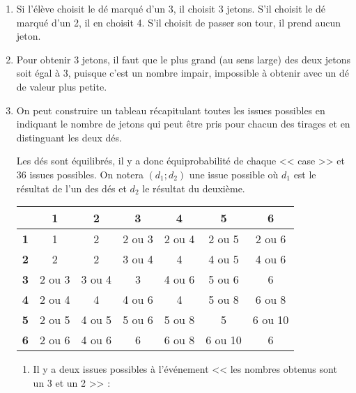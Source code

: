 \begin{enumerate}
    \item Si l'élève choisit le dé marqué d'un 3, il choisit 3 jetons. S'il choisit le dé marqué d'un 2, il en choisit 4. S'il choisit de passer son tour, il prend aucun jeton. \par
    \item Pour obtenir 3 jetons, il faut que  le plus grand (au sens large) des deux jetons soit égal à 3, puisque c'est un nombre impair, impossible à obtenir avec un dé de valeur plus petite. \par
    \item On peut construire un tableau récapitulant toutes les issues possibles en indiquant le nombre de jetons qui peut être pris pour chacun des tirages et en distinguant les deux dés. \par
       Les dés sont équilibrés, il y a donc équiprobabilité de chaque << case >> et 36 issues possibles. On notera $(d_1;d_2)$ une issue possible où $d_1$ est le résultat de l'un des dés et $d_2$ le résultat du deuxième.
       \begin{center}
          {
          \begin{tabular}{|*{7}{C{1.2}|}}
             \hline
             & \bf 1 & \bf 2 & \bf 3 & \bf 4 & \bf 5 & \bf 6 \\
             \hline
             \bf 1 & 1 & 2 & 2 ou 3 & 2 ou 4 & 2 ou 5 & 2 ou 6 \\
             \hline
             \bf 2 & 2 & 2 & 3 ou 4 & 4 & 4 ou 5 & 4 ou 6 \\
             \hline
             \bf 3 & 2 ou 3 & 3 ou 4 & 3 & 4 ou 6 & 5 ou 6 & 6 \\
             \hline
             \bf 4 & 2 ou 4 & 4 & 4 ou 6 & 4 & 5 ou 8 & 6 ou 8 \\
             \hline
             \bf 5 & 2 ou 5 & 4 ou 5 & 5 ou 6 & 5 ou 8 & 5 & 6 ou 10 \\
             \hline
             \bf 6 & 2 ou 6 & 4 ou 6 & 6 & 6 ou 8 & 6 ou 10 & 6 \\
             \hline
          \end{tabular}}
       \end{center}
       \begin{enumerate}
          \item Il y a deux issues possibles à l'événement << les nombres obtenus sont un 3 et un 2 >> : \par

\end{enumerate}
\end{enumerate}
